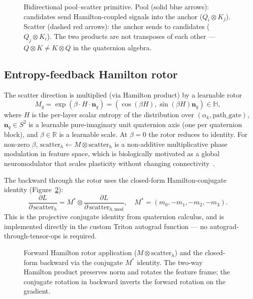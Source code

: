 \documentclass[11pt, a4paper]{article}
\begin{document}
\begin{figure}[t]
  \centering
  
  \caption{Bidirectional pool--scatter primitive. Pool (solid blue
  arrows): candidates send Hamilton-coupled signals into the anchor
  ($Q_i \otimes K_j$). Scatter (dashed red arrows): the anchor sends
  to candidates ($Q_j \otimes K_i$). The two products are not
  transposes of each other --- $Q \otimes K \ne K \otimes Q$ in the
  quaternion algebra.}
  \label{fig:ps}
\end{figure}

\subsection{Entropy-feedback Hamilton rotor}
\label{sec:rotor}

The scatter direction is multiplied (via Hamilton product) by a
learnable rotor
\begin{equation}
M_q = \exp(\beta \cdot H \cdot \mathbf{n}_q)
    = (\cos(\beta H), \sin(\beta H) \mathbf{n}_q) \in \mathbb{H},
    \label{eq:rotor}
\end{equation}
where $H$ is the per-layer scalar entropy of the distribution over
$(\alpha_k, \text{path\_gate})$, $\mathbf{n}_q \in S^2$ is a learnable
pure-imaginary unit quaternion axis (one per quaternion block), and
$\beta \in \mathbb{R}$ is a learnable scale. At $\beta = 0$ the rotor
reduces to identity. For non-zero $\beta$,
$\mathrm{scatter}_h \gets M \otimes \mathrm{scatter}_h$ is a
non-additive multiplicative phase modulation in feature space, which
is biologically motivated as a global neuromodulator that scales
plasticity without changing connectivity~\cite{schultz1997dopamine,
fremaux2016three}.

The backward through the rotor uses the closed-form Hamilton-conjugate
identity (Figure~\ref{fig:rotor}):
\begin{equation}
\frac{\partial L}{\partial\,\mathrm{scatter}_h}
  = M^{*} \otimes \frac{\partial L}{\partial\,\mathrm{scatter}_{h,\text{mod}}},
  \quad M^{*} = (m_0, -m_1, -m_2, -m_3).
\end{equation}
This is the projective conjugate identity from quaternion calculus,
and is implemented directly in the custom Triton autograd function ---
no autograd-through-tensor-ops is required.

\begin{figure}[t]
  \centering
  
  \caption{Forward Hamilton rotor application
  ($M \otimes \mathrm{scatter}_h$) and the closed-form backward via
  the conjugate $M^{*}$ identity. The two-way Hamilton product
  preserves norm and rotates the feature frame; the conjugate
  rotation in backward inverts the forward rotation on the gradient.}
  \label{fig:rotor}
\end{figure}
\end{document}
